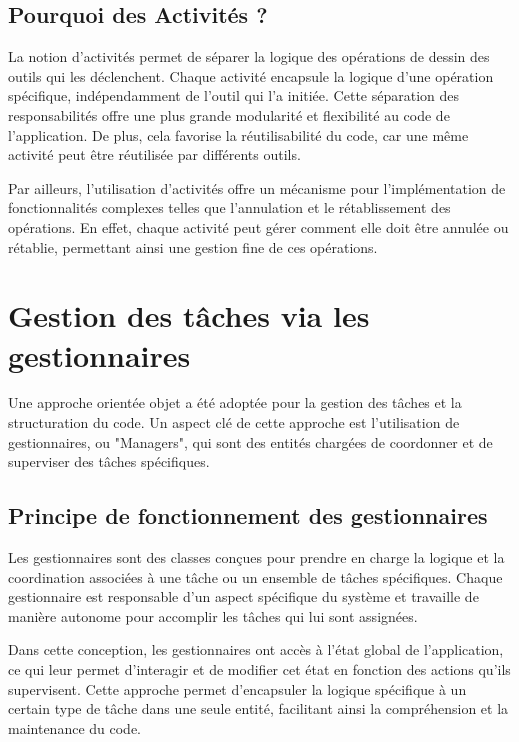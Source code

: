 \subsection{Pourquoi des Activités ?}

La notion d'activités permet de séparer la logique des opérations de dessin des outils qui les déclenchent. Chaque activité encapsule la logique d'une opération spécifique, indépendamment de l'outil qui l'a initiée. Cette séparation des responsabilités offre une plus grande modularité et flexibilité au code de l'application. De plus, cela favorise la réutilisabilité du code, car une même activité peut être réutilisée par différents outils.

Par ailleurs, l'utilisation d'activités offre un mécanisme pour l'implémentation de fonctionnalités complexes telles que l'annulation et le rétablissement des opérations. En effet, chaque activité peut gérer comment elle doit être annulée ou rétablie, permettant ainsi une gestion fine de ces opérations.

\section{Gestion des tâches via les gestionnaires}

Une approche orientée objet a été adoptée pour la gestion des tâches et la structuration du code. Un aspect clé de cette approche est l'utilisation de gestionnaires, ou "Managers", qui sont des entités chargées de coordonner et de superviser des tâches spécifiques.

\subsection{Principe de fonctionnement des gestionnaires}

Les gestionnaires sont des classes conçues pour prendre en charge la logique et la coordination associées à une tâche ou un ensemble de tâches spécifiques. Chaque gestionnaire est responsable d'un aspect spécifique du système et travaille de manière autonome pour accomplir les tâches qui lui sont assignées.

Dans cette conception, les gestionnaires ont accès à l'état global de l'application, ce qui leur permet d'interagir et de modifier cet état en fonction des actions qu'ils supervisent. Cette approche permet d'encapsuler la logique spécifique à un certain type de tâche dans une seule entité, facilitant ainsi la compréhension et la maintenance du code.


